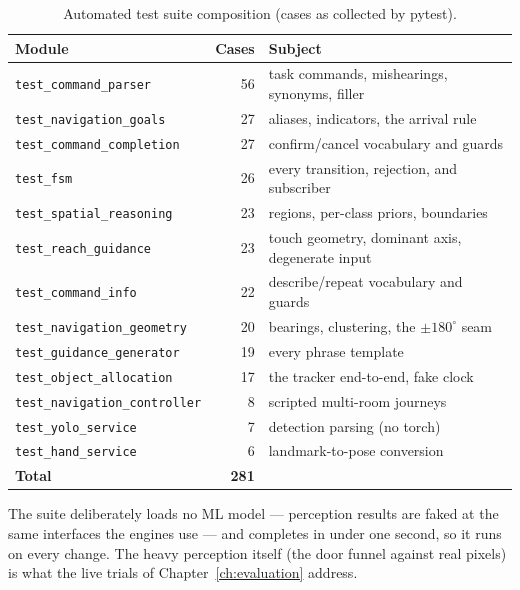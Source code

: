 \begin{table}[!htbp]
\centering
\caption[Test suite composition]{Automated test suite composition (cases as
collected by pytest).}
\label{tab:tests}
\small
\begin{tabular}{l r p{6.6cm}}
\toprule
\textbf{Module} & \textbf{Cases} & \textbf{Subject} \\
\midrule
\texttt{test\_command\_parser}        & 56 & task commands, mishearings, synonyms, filler \\
\texttt{test\_navigation\_goals}      & 27 & aliases, indicators, the arrival rule \\
\texttt{test\_command\_completion}    & 27 & confirm/cancel vocabulary and guards \\
\texttt{test\_fsm}                    & 26 & every transition, rejection, and subscriber \\
\texttt{test\_spatial\_reasoning}     & 23 & regions, per-class priors, boundaries \\
\texttt{test\_reach\_guidance}        & 23 & touch geometry, dominant axis, degenerate input \\
\texttt{test\_command\_info}          & 22 & describe/repeat vocabulary and guards \\
\texttt{test\_navigation\_geometry}   & 20 & bearings, clustering, the $\pm180^\circ$ seam \\
\texttt{test\_guidance\_generator}    & 19 & every phrase template \\
\texttt{test\_object\_allocation}     & 17 & the tracker end-to-end, fake clock \\
\texttt{test\_navigation\_controller} &  8 & scripted multi-room journeys \\
\texttt{test\_yolo\_service}          &  7 & detection parsing (no torch) \\
\texttt{test\_hand\_service}          &  6 & landmark-to-pose conversion \\
\midrule
\textbf{Total} & \textbf{281} & \\
\bottomrule
\end{tabular}
\end{table}

The suite deliberately loads no ML model --- perception results are faked at the
same interfaces the engines use --- and completes in under one second, so it runs
on every change. The heavy perception itself (the door funnel against real
pixels) is what the live trials of Chapter~\ref{ch:evaluation} address.